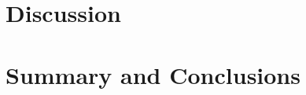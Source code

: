 \documentclass[draft]{agujournal2019}
\begin{document}
\section{Discussion}

\section{Summary and Conclusions}



%


%
%
%
%





\end{document}
